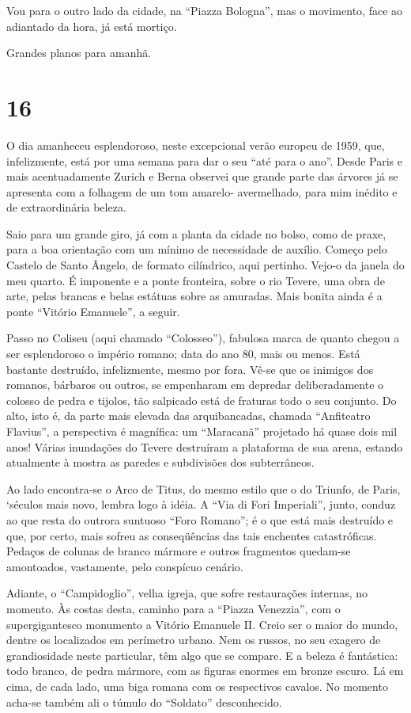 Vou para o outro lado da cidade, na “Piazza Bologna”, mas o movimento, face ao adiantado da hora, já está mortiço.

Grandes planos para amanhã.

\section*{16 \adfflatleafright {}}
O dia amanheceu esplendoroso, neste excepcional verão europeu de 1959, que, infelizmente, está por uma semana para dar o seu “até para o ano”. Desde Paris e mais acentuadamente Zurich e Berna observei que grande parte das árvores já se apresenta com a folhagem de um tom amarelo- avermelhado, para mim inédito e de extraordinária beleza.

Saio para um grande giro, já com a planta da cidade no bolso, como de praxe, para a boa orientação com um mínimo de necessidade de auxílio. Começo pelo Castelo de Santo Ângelo, de formato cilíndrico, aqui pertinho. Vejo-o da janela do meu quarto. É imponente e a ponte fronteira, sobre o rio Tevere, uma obra de arte, pelas brancas e belas estátuas sobre as amuradas. Mais bonita ainda é a ponte “Vitório Emanuele”, a seguir.

Passo no Coliseu (aqui chamado “Colosseo”), fabulosa marca de quanto chegou a ser esplendoroso o império romano; data do ano 80, mais ou menos. Está bastante destruído, infelizmente, mesmo por fora. Vê-se que os inimigos dos romanos, bárbaros ou outros, se empenharam em depredar deliberadamente o colosso de pedra e tijolos, tão salpicado está de fraturas todo o seu conjunto. Do alto, isto é, da parte mais elevada das arquibancadas, chamada “Anfiteatro Flavius”, a perspectiva é magnífica: um “Maracanã” projetado há quase dois mil anos! Várias inundações do Tevere destruíram a plataforma de sua arena, estando atualmente à mostra as paredes e subdivisões dos subterrâneos.

Ao lado encontra-se o Arco de Titus, do mesmo estilo que o do Triunfo, de Paris, ‘séculos mais novo, lembra logo à idéia. A “Via di Fori Imperiali”, junto, conduz ao que resta do outrora suntuoso “Foro Romano”; é o que está mais destruído e que, por certo, mais sofreu as conseqüências das tais enchentes catastróficas. Pedaços de colunas de branco mármore e outros fragmentos quedam-se amontoados, vastamente, pelo conspícuo cenário.

Adiante, o “Campidoglio”, velha igreja, que sofre restaurações internas, no momento. Às costas desta, caminho para a “Piazza Venezzia”, com o supergigantesco monumento a Vitório Emanuele II. Creio ser o maior do mundo, dentre os localizados em perímetro urbano. Nem os russos, no seu exagero de grandiosidade neste particular, têm algo que se compare. E a beleza é fantástica: todo branco, de pedra mármore, com as figuras enormes em bronze escuro. Lá em cima, de cada lado, uma biga romana com os respectivos cavalos. No momento acha-se também ali o túmulo do “Soldato” desconhecido.

